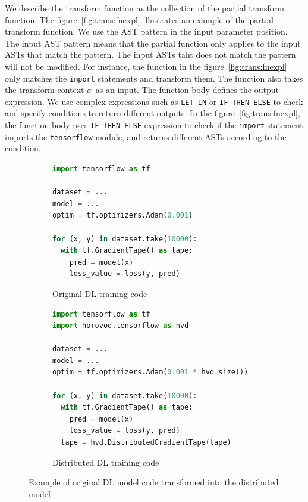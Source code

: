 We describe the transform function as the collection of the partial transform
function. 
The figure~\ref{fig:trans:fnexpl} illustrates an example of the
partial transform function.
We use the AST pattern in the input parameter position.
The input AST pattern means that the partial function only applies
to the input ASTs that match the pattern.
The input ASTs taht does not match the pattern will not be modified.
For instance, the function in the figure~\ref{fig:trans:fnexpl} only matches
the {\tt import} statements and transform them. 
The function also takes the transform context $\sigma$ as an input.
The function body defines the output expression. 
We use complex expressions such as {\tt LET-IN} or {\tt IF-THEN-ELSE} to 
check and specify conditions to return different outputs.
In the figure~\ref{fig:trans:fnexpl}, 
the function body uses {\tt IF-THEN-ELSE} expression to check if the 
{\tt import} statement imports the {\tt tensorflow} module, 
and returns different ASTs according to the condition.

\pagebreak
\begin{figure}[ht!]
  \centering
  \begin{subfigure}[t]{0.48\textwidth}
    \begin{lstlisting}[language=Python]
import tensorflow as tf

dataset = ...
model = ...
optim = tf.optimizers.Adam(0.001) 

for (x, y) in dataset.take(10000):
  with tf.GradientTape() as tape:
    pred = model(x)
    loss_value = loss(y, pred)\end{lstlisting} 
    \caption{Original DL training code}
  \end{subfigure}
  \hspace{5mm}
  \begin{subfigure}[t]{0.48\textwidth}
    \begin{lstlisting}[language=Python]
import tensorflow as tf
import horovod.tensorflow as hvd

dataset = ...
model = ...
optim = tf.optimizers.Adam(0.001 * hvd.size()) 

for (x, y) in dataset.take(10000):
  with tf.GradientTape() as tape:
    pred = model(x)
    loss_value = loss(y, pred) 
  tape = hvd.DistributedGradientTape(tape)\end{lstlisting}
    \caption{Distributed DL training code}
  \end{subfigure}
  \caption{Example of original DL model code transformed into the distributed model}
  \label{fig:trans:ex}
\end{figure}


